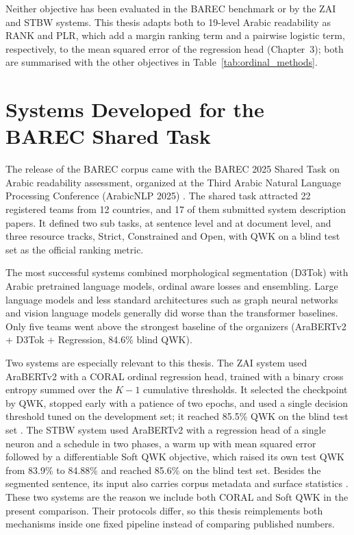 Neither objective has been evaluated in the BAREC benchmark or by the ZAI and STBW systems. This thesis adapts both to 19-level Arabic readability as RANK and PLR, which add a margin ranking term and a pairwise logistic term, respectively, to the mean squared error of the regression head (Chapter~3); both are summarised with the other objectives in Table~\ref{tab:ordinal_methods}.

\section{Systems Developed for the BAREC Shared Task}

The release of the BAREC corpus came with the BAREC 2025 Shared Task on Arabic readability assessment, organized at the Third Arabic Natural Language Processing Conference (ArabicNLP 2025) \cite{elmadani2025sharedtask}. The shared task attracted 22 registered teams from 12 countries, and 17 of them submitted system description papers. It defined two sub tasks, at sentence level and at document level, and three resource tracks, Strict, Constrained and Open, with QWK on a blind test set as the official ranking metric.

The most successful systems combined morphological segmentation (D3Tok) with Arabic pretrained language models, ordinal aware losses and ensembling. Large language models and less standard architectures such as graph neural networks and vision language models generally did worse than the transformer baselines. Only five teams went above the strongest baseline of the organizers (AraBERTv2 + D3Tok + Regression, 84.6\% blind QWK).

Two systems are especially relevant to this thesis. The ZAI system used AraBERTv2 with a CORAL ordinal regression head, trained with a binary cross entropy summed over the $K{-}1$ cumulative thresholds. It selected the checkpoint by QWK, stopped early with a patience of two epochs, and used a single decision threshold tuned on the development set; it reached 85.5\% QWK on the blind test set \cite{nazzal2025zai}. The STBW system used AraBERTv2 with a regression head of a single neuron and a schedule in two phases, a warm up with mean squared error followed by a differentiable Soft QWK objective, which raised its own test QWK from 83.9\% to 84.88\% and reached 85.6\% on the blind test set. Besides the segmented sentence, its input also carries corpus metadata and surface statistics \cite{trigui2025stbw}. These two systems are the reason we include both CORAL and Soft QWK in the present comparison. Their protocols differ, so this thesis reimplements both mechanisms inside one fixed pipeline instead of comparing published numbers.

